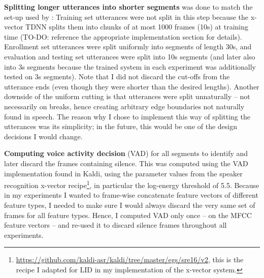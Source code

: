 \documentclass[bsc,frontabs,twoside,singlespacing,parskip,deptreport]{infthesis}
\begin{document}
{{    %
    \textbf{Splitting longer utterances into shorter segments} was done to match the set-up used by \citet{Snyder_et_al_2018}: Training set utterances were not split in this step because the x-vector TDNN splits them into chunks of at most 1000 frames (10s) at training time (TO-DO: reference the appropriate implementation section for details). Enrollment set utterances were split uniformly into segments of length 30s, and evaluation and testing set utterances were split into 10s segments (and later also into 3s segments because the trained system in each experiment was additionally tested on 3s segments). Note that I did not discard the cut-offs from the utterance ends (even though they were shorter than the desired lengths). Another downside of the uniform cutting is that utterances were split unnaturally -- not necessarily on breaks, hence creating arbitrary edge boundaries not naturally found in speech. The reason why I chose to implement this way of splitting the utterances was its simplicity; in the future, this would be one of the design decisions I would change.
    
    \textbf{Computing voice activity decision} (VAD) for all segments to identify and later discard the frames containing silence. This was computed using the VAD implementation found in Kaldi, using the parameter values from the speaker recognition x-vector recipe\footnote{\url{https://github.com/kaldi-asr/kaldi/tree/master/egs/sre16/v2}, this is the recipe I adapted for LID in my implementation of the x-vector system.}, in particular the log-energy threshold of 5.5. Because in my experiments I wanted to frame-wise concatenate feature vectors of different feature types, I needed to make sure I would always discard the very same set of frames for all feature types. Hence, I computed VAD only once -- on the MFCC feature vectors -- and re-used it to discard silence frames throughout all experiments.
  }

}
\end{document}
